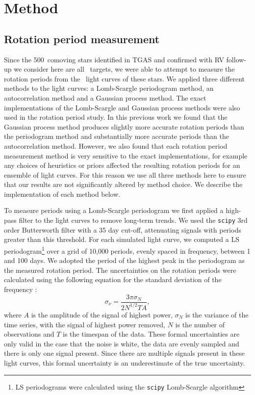 \newcommand{\nconfirmed}{500}
\newcommand{\dantodo}[1]{{\color{blue}#1}}

\section{Method}
\label{sec:method}

\subsection{Rotation period measurement}

Since the \nconfirmed\ comoving stars identified in TGAS and confirmed with RV
follow-up we consider here are all \Kepler\ targets, we were able to attempt
to measure the rotation periods from the \kepler\ light curves of these stars.
We applied three different methods to the light curves: a Lomb-Scargle
periodogram method, an autocorrelation method and a Gaussian process method.
The exact implementations of the Lomb-Scargle and Gaussian process methods
were also used in the \citet{Angus2017} rotation period study.
In this previous work we found that the Gaussian process method produces
slightly more accurate rotation periods than the periodogram method and
substantially more accurate periods than the autocorrelation method.
However, we also found that each rotation period measurement method is very
sensitive to the exact implementations, for example any choices of heuristics
or priors affected the resulting rotation periods for an ensemble of light
curves.
For this reason we use all three methods here to ensure that our results are
not significantly altered by method choice.
We describe the implementation of each method below.

To measure periods using a Lomb-Scargle periodogram we first applied a
high-pass filter to the light curves to remove long-term trends.
We used the {\tt scipy} 3rd order Butterworth filter with a 35 day cut-off,
attenuating signals with periods greater than this threshold.
For each simulated light curve, we computed a LS periodogram\footnote{LS
periodograms were calculated using the {\tt scipy} Lomb-Scargle algorithm}
over a grid of 10,000 periods, evenly spaced in frequency, between 1 and 100
days.
We adopted the period of the highest peak in the periodogram as the measured
rotation period.
The uncertainties on the rotation periods were calculated using the
following equation for the standard deviation of the frequency
\citep{Horne1986, Kovacs1981}:
\begin{equation}
    \sigma_{\nu} = \frac{3\pi\sigma_N}{2N^{1/2}TA},
\end{equation}
where $A$ is the amplitude of the signal of highest power, $\sigma_N$ is the
variance of the time series, with the signal of highest power removed, $N$
is the number of observations and $T$ is the timespan of the data.
These formal uncertainties are only valid in the case that the noise is white,
the data are evenly sampled and there is only one signal present.
Since there are multiple signals present in these light curves, this formal
uncertainty is an underestimate of the true uncertainty.


